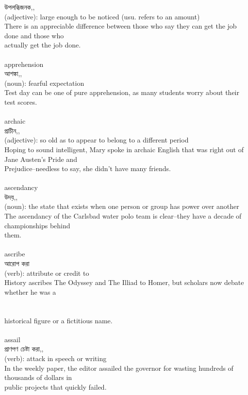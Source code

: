 \documentclass{article}
\begin{document}
{উপলব্ধিজনক,,}\\
{(adjective): large enough to be noticed (usu. refers to an amount)\\There is an appreciable difference between those who say they can get the job done and those who\\actually get the job done.\\}\\
{apprehension}\\
{আশঙ্কা,,}\\
{(noun): fearful expectation\\Test day can be one of pure apprehension, as many students worry about their test scores.\\}\\
{archaic}\\
{প্রাচীন,,}\\
{(adjective): so old as to appear to belong to a different period\\Hoping to sound intelligent, Mary spoke in archaic English that was right out of Jane Austen's Pride and\\Prejudice--needless to say, she didn't have many friends.\\}\\
{ascendancy}\\
{উদয়,,}\\
{(noun): the state that exists when one person or group has power over another\\The ascendancy of the Carlsbad water polo team is clear--they have a decade of championships behind\\them.\\}\\
{ascribe}\\
{আরোপ করা}\\
{(verb): attribute or credit to\\History ascribes The Odyssey and The Illiad to Homer, but scholars now debate whether he was a\\\\                                                                               \\historical figure or a fictitious name.\\}\\
{assail}\\
{প্রাণপণ চেষ্টা করা,,}\\
{(verb): attack in speech or writing\\In the weekly paper, the editor assailed the governor for wasting hundreds of thousands of dollars in\\public projects that quickly failed.\\}\\
\end{document}
